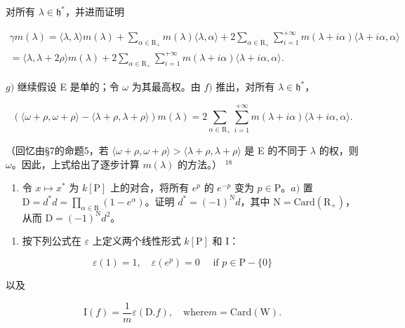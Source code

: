 对所有 \(\lambda \in \mathfrak{h}^*\)，并进而证明

\[
\begin{array}{l} \gamma m (\lambda) = \langle \lambda , \lambda \rangle m (\lambda) + \sum_ {\alpha \in \mathrm{R} _ {+}} m (\lambda) \langle \lambda , \alpha \rangle + 2 \sum_ {\alpha \in \mathrm{R} _ {+}} \sum_ {i = 1} ^ {+ \infty} m (\lambda + i \alpha) \langle \lambda + i \alpha , \alpha \rangle \\ = \langle \lambda , \lambda + 2 \rho \rangle m (\lambda) + 2 \sum_ {\alpha \in \mathrm{R} _ {+}} \sum_ {i = 1} ^ {+ \infty} m (\lambda + i \alpha) \langle \lambda + i \alpha , \alpha \rangle . \end{array}
\]

\(g)\) 继续假设 E 是单的；令 \(\omega\) 为其最高权。由 \(f)\) 推出，对所有 \(\lambda \in \mathfrak{h}^*\)，

\[
(\langle \omega + \rho , \omega + \rho \rangle - \langle \lambda + \rho , \lambda + \rho \rangle) m (\lambda) = 2 \sum_ {\alpha \in \mathrm{R} _ {+}} \sum_ {i = 1} ^ {+ \infty} m (\lambda + i \alpha) \langle \lambda + i \alpha , \alpha \rangle .
\]

（回忆由§7的命题5，若 \(\langle\omega+\rho,\omega+\rho\rangle>\langle\lambda+\rho,\lambda+\rho\rangle\) 是 E 的不同于 \(\lambda\) 的权，则 \(\omega\)。因此，上式给出了逐步计算 \(m(\lambda)\) 的方法。） \(^{18}\)

\begin{enumerate}
\def\labelenumi{\arabic{enumi})}
\setcounter{enumi}{5}
\tightlist
\item
  令 \(x \mapsto x^*\) 为 \(k[\mathrm{P}]\) 上的对合，将所有 \(e^p\) 的 \(e^{-p}\) 变为 \(p \in \mathrm{P}\)。\(a)\) 置 \(\mathrm{D} = d^* d = \prod_{\alpha \in \mathrm{R}} (1 - e^\alpha)\)。证明 \(d^* = (-1)^{\mathrm{N}} d\)，其中 \(\mathrm{N} = \mathrm{Card}(\mathrm{R}_+)\)，从而 \(\mathrm{D} = (-1)^{\mathrm{N}} d^2\)。
\end{enumerate}

\begin{enumerate}
\def\labelenumi{\alph{enumi})}
\setcounter{enumi}{1}
\tightlist
\item
  按下列公式在 \(\varepsilon\) 上定义两个线性形式 \(k[\mathrm{P}]\) 和 I：
\end{enumerate}

\[
\varepsilon (1) = 1, \quad \varepsilon (e ^ {p}) = 0 \quad \text { if } p \in \mathrm{P} - \{0 \}
\]

以及

\[
\mathrm{I} (f) = \frac {1}{m} \varepsilon (\mathrm{D}. f), \quad \mathrm{where} m = \mathrm{Card} (\mathrm{W}).
\]


